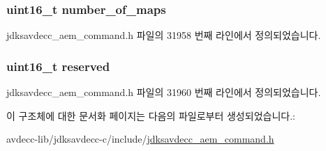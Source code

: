 \subsubsection[{\texorpdfstring{number\+\_\+of\+\_\+maps}{number_of_maps}}]{\setlength{\rightskip}{0pt plus 5cm}uint16\+\_\+t number\+\_\+of\+\_\+maps}\hypertarget{structjdksavdecc__aem__command__get__sensor__map__response_a6d00316ed943197ab46c0af22c1d430a}{}\label{structjdksavdecc__aem__command__get__sensor__map__response_a6d00316ed943197ab46c0af22c1d430a}


jdksavdecc\+\_\+aem\+\_\+command.\+h 파일의 31958 번째 라인에서 정의되었습니다.

\subsubsection[{\texorpdfstring{reserved}{reserved}}]{\setlength{\rightskip}{0pt plus 5cm}uint16\+\_\+t reserved}\hypertarget{structjdksavdecc__aem__command__get__sensor__map__response_a5a6ed8c04a3db86066924b1a1bf4dad3}{}\label{structjdksavdecc__aem__command__get__sensor__map__response_a5a6ed8c04a3db86066924b1a1bf4dad3}


jdksavdecc\+\_\+aem\+\_\+command.\+h 파일의 31960 번째 라인에서 정의되었습니다.



이 구조체에 대한 문서화 페이지는 다음의 파일로부터 생성되었습니다.\+:\begin{DoxyCompactItemize}
\item 
avdecc-\/lib/jdksavdecc-\/c/include/\hyperlink{jdksavdecc__aem__command_8h}{jdksavdecc\+\_\+aem\+\_\+command.\+h}\end{DoxyCompactItemize}
